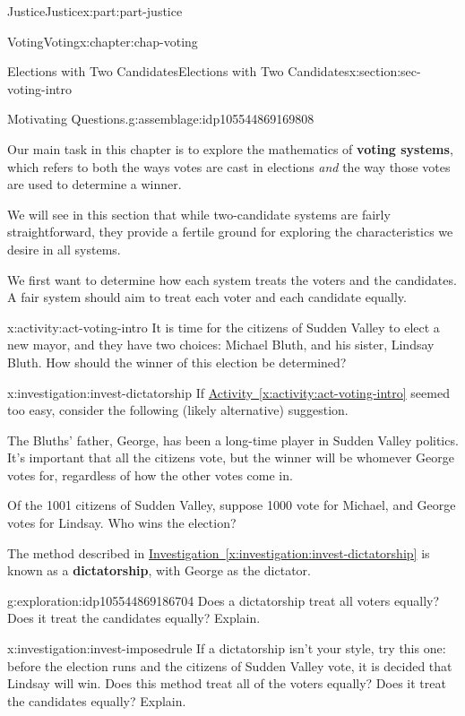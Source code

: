 \documentclass[oneside,10pt,]{book}
\newcommand{\xreffont}{\relax}
\newcommand{\terminology}[1]{\textbf{#1}}
\numberwithin{equation}{section}
\begin{document}
\begin{partptx}{Justice}{}{Justice}{}{}{x:part:part-justice}
\begin{chapterptx}{Voting}{}{Voting}{}{}{x:chapter:chap-voting}
\begin{sectionptx}{Elections with Two Candidates}{}{Elections with Two Candidates}{}{}{x:section:sec-voting-intro}
\begin{assemblage}{Motivating Questions.}{g:assemblage:idp105544869169808}
%
\end{assemblage}
\begin{introduction}{}%
Our main task in this chapter is to explore the mathematics of \terminology{voting systems}, which refers to both the ways votes are cast in elections \emph{and} the way those votes are used to determine a winner.%
\par
We will see in this section that while two-candidate systems are fairly straightforward, they provide a fertile ground for exploring the characteristics we desire in all systems.%
\par
We first want to determine how each system treats the voters and the candidates. A fair system should aim to treat each voter and each candidate equally.%
\end{introduction}%
\begin{activity}{}{x:activity:act-voting-intro}%
It is time for the citizens of Sudden Valley to elect a new mayor, and they have two choices: Michael Bluth, and his sister, Lindsay Bluth. How should the winner of this election be determined?%
\end{activity}%
\begin{investigation}{}{x:investigation:invest-dictatorship}%
If \hyperref[x:activity:act-voting-intro]{Activity~{\xreffont\ref{x:activity:act-voting-intro}}} seemed too easy, consider the following (likely alternative) suggestion.%
\par
The Bluths' father, George, has been a long-time player in Sudden Valley politics. It's important that all the citizens vote, but the winner will be whomever George votes for, regardless of how the other votes come in.%
\par
Of the 1001 citizens of Sudden Valley, suppose 1000 vote for Michael, and George votes for Lindsay. Who wins the election?%
\end{investigation}%
The method described in \hyperref[x:investigation:invest-dictatorship]{Investigation~{\xreffont\ref{x:investigation:invest-dictatorship}}} is known as a \terminology{dictatorship}, with George as the dictator.%
\begin{exploration}{}{g:exploration:idp105544869186704}%
Does a dictatorship treat all voters equally? Does it treat the candidates equally? Explain.%
\end{exploration}%
\begin{investigation}{}{x:investigation:invest-imposedrule}%
If a dictatorship isn't your style, try this one: before the election runs and the citizens of Sudden Valley vote, it is decided that Lindsay will win. Does this method treat all of the voters equally? Does it treat the candidates equally? Explain.%

\end{investigation}
\end{sectionptx}
\end{chapterptx}
\end{partptx}
\end{document}
